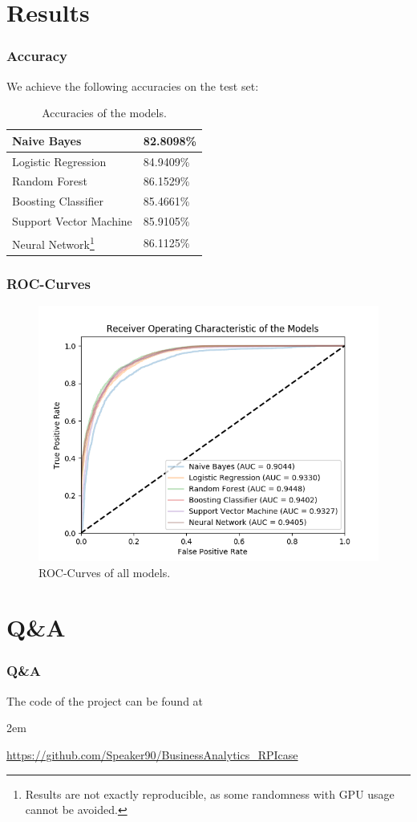 \documentclass[xcolor=sgvnames,serifs,notes,compress,professionalfont]{beamer}
\begin{document}
\section{Results}
\begin{frame}
\frametitle{Accuracy}
We achieve the following accuracies on the test set:
\begin{table}
	\begin{tabular}{|l|l|}
		\hline
		Naive Bayes & 82.8098\%\\\hline
		Logistic Regression & 84.9409\%\\\hline
		\cellcolor{green!25}Random Forest & \cellcolor{green!25}86.1529\%\\\hline
		Boosting Classifier & 85.4661\%\\\hline
		Support Vector Machine &  85.9105\%\\\hline
		Neural Network\footnote{Results are not exactly reproducible, as some randomness with GPU usage cannot be avoided.} & 86.1125\%\\
		\hline 
	\end{tabular}
	\caption{Accuracies of the models.}
	\label{tab:Accs}
\end{table}
\end{frame}

\begin{frame}
\frametitle{ROC-Curves}
\begin{figure}
	\includegraphics[height=0.75\textheight]{pictures/rocs.png}    
	\caption{ROC-Curves of all models.}
	\label{fig: rocs}
\end{figure}
\end{frame}

\section{Q\&A}
\begin{frame}
\frametitle{Q\&A}
\begin{center}
	The code of the project can be found at
\end{center}
	\kern 2em
\begin{center}
	\url{https://github.com/Speaker90/BusinessAnalytics_RPIcase}
\end{center}
\end{frame}
\end{document}
